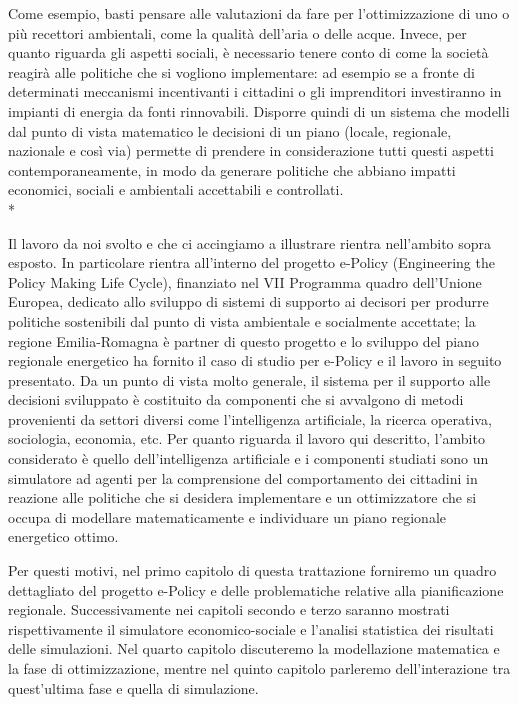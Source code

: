 Come esempio, basti pensare alle valutazioni da fare per l'ottimizzazione di uno o più recettori ambientali, come la qualità dell'aria o delle acque. Invece, per quanto riguarda gli aspetti sociali, è necessario tenere conto di come la società reagirà alle politiche che si vogliono implementare: ad esempio se a fronte di determinati meccanismi incentivanti i cittadini o gli imprenditori investiranno in impianti di energia da fonti rinnovabili. Disporre quindi di un sistema che modelli dal punto di vista matematico le decisioni di un piano (locale, regionale, nazionale e così via) permette di prendere in considerazione tutti questi aspetti contemporaneamente, in modo da generare politiche che abbiano impatti economici, sociali e ambientali accettabili e controllati. 
\\*

Il lavoro da noi svolto e che ci accingiamo a illustrare rientra nell'ambito sopra esposto. In particolare rientra all'interno del progetto e-Policy (Engineering the Policy Making Life Cycle), finanziato nel VII Programma quadro dell'Unione Europea, dedicato allo sviluppo di sistemi di supporto ai decisori per produrre politiche sostenibili dal punto di vista ambientale e socialmente accettate; la regione Emilia-Romagna è partner di questo progetto e lo sviluppo del piano regionale energetico ha fornito il caso di studio per e-Policy e il lavoro in seguito presentato. Da un punto di vista molto generale, il sistema per il supporto alle decisioni sviluppato è costituito da componenti che si avvalgono di metodi provenienti da settori diversi come l'intelligenza artificiale, la ricerca operativa, sociologia, economia, etc. Per quanto riguarda il lavoro qui descritto, l'ambito considerato è quello dell'intelligenza artificiale e i componenti studiati sono un simulatore ad agenti per la comprensione del comportamento dei cittadini in reazione alle politiche che si desidera implementare e un ottimizzatore che si occupa di modellare matematicamente e individuare un piano regionale energetico ottimo. 

Per questi motivi, nel primo capitolo di questa trattazione forniremo un quadro dettagliato del progetto e-Policy e delle problematiche relative alla pianificazione regionale. 
Successivamente nei capitoli secondo e terzo saranno mostrati rispettivamente il simulatore economico-sociale e l'analisi statistica dei risultati delle simulazioni. 
Nel quarto capitolo discuteremo la modellazione matematica e la fase di ottimizzazione, mentre nel quinto capitolo parleremo dell'interazione tra quest'ultima fase e quella di simulazione.

%
